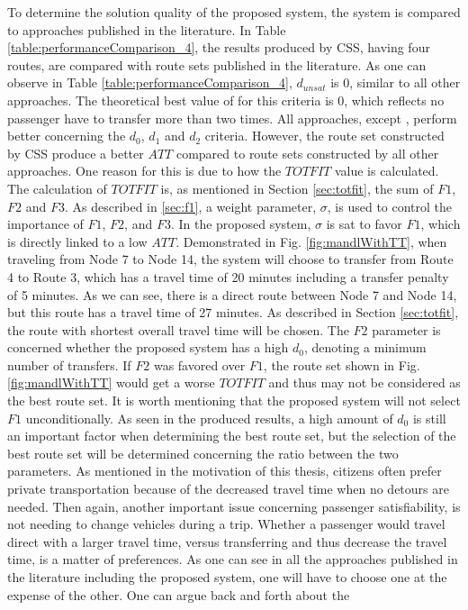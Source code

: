 
To determine the solution quality of the proposed system, the system is compared to approaches published in the literature. In Table \vref{table:performanceComparison_4}, the results produced by CSS, having four routes, are compared with route sets published in the literature. As one can observe in Table \vref{table:performanceComparison_4},  $d_{unsat}$ is 0, similar to all other approaches. The theoretical best value of for this criteria is 0, which reflects no passenger have to transfer more than two times. All approaches, except \citep{mandl79, kidwai98, chakroborty02}, perform better concerning the $d_0$, $d_1$ and $d_2$ criteria. However, the route set constructed by CSS produce a better $ATT$ compared to route sets constructed by all other approaches. One reason for this is due to how the $TOTFIT$ value is calculated. The calculation of $TOTFIT$ is, as mentioned in Section \vref{sec:totfit}, the sum of $F1$, $F2$ and $F3$. As described in \vref{sec:f1}, a weight parameter, $\sigma$, is used to control the importance of $F1$, $F2$, and $F3$. In the proposed system, $\sigma$ is sat to favor $F1$, which is directly linked to a low $ATT$. Demonstrated in Fig. \vref{fig:mandlWithTT}, when traveling from Node 7 to Node 14, the system will choose to transfer from Route 4 to Route 3, which has a travel time of 20 minutes including a transfer penalty of 5 minutes. As we can see, there is a direct route between Node 7 and Node 14, but this route has a travel time of 27 minutes. As described in Section \vref{sec:totfit}, the route with shortest overall travel time will be chosen. The $F2$ parameter is concerned whether the proposed system has a high $d_0$, denoting a minimum number of transfers. If $F2$ was favored over $F1$, the route set shown in Fig. \vref{fig:mandlWithTT} would get a worse $TOTFIT$ and thus may not be considered as the best route set. It is worth mentioning that the proposed system will not select $F1$ unconditionally. As seen in the produced results, a high amount of $d_0$ is still an important factor when determining the best route set, but the selection of the best route set will be determined concerning the ratio between the two parameters. As mentioned in the motivation of this thesis, citizens often prefer private transportation because of the decreased travel time when no detours are needed. Then again, another important issue concerning passenger satisfiability, is not needing to change vehicles during a trip. Whether a passenger would travel direct with a larger travel time, versus transferring and thus decrease the travel time, is a matter of preferences. As one can see in all the approaches published in the literature including the proposed system, one will have to choose one at the expense of the other. One can argue back and forth about the 